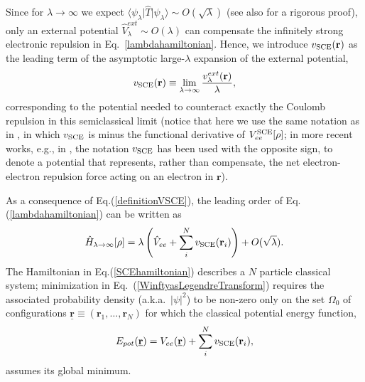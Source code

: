 \documentclass[aps,pra,twocolumn,superscriptaddress]{revtex4}
\begin{document}
Since for $\lambda\to\infty$ we expect $\langle\psi_{\lambda}\vert\hat{T}\vert\psi_{\lambda}\rangle\sim O(\sqrt{\lambda})$ \citep{Sei-PRA-99,SeiGorSav-PRA-07,GorVigSei-JCTC-09} (see also \citep{Lew-arxiv-17} for a rigorous proof),  only an external potential $\hat{V}_{\lambda}^{ext}\sim O(\lambda)$ can compensate the infinitely strong electronic repulsion in Eq.~\eqref{lambdahamiltonian}. Hence, we introduce $v_{\rm{SCE}}(\textbf{r})$ as the leading term of the asymptotic large-$\lambda$ expansion of the external potential,
 \begin{equation}\label{definitionVSCE}
v_{\rm{SCE}}(\textbf{r})\equiv \lim_{\lambda\to\infty}\frac{v^{ext}_{\lambda}(\textbf{r})}{\lambda},
\end{equation}
corresponding to the potential needed to counteract exactly the Coulomb repulsion in this semiclassical limit \citep{SeiGorSav-PRA-07} (notice that here we use the same notation as in \citep{SeiGorSav-PRA-07,GorVigSei-JCTC-09}, in which $v_{\rm SCE}$ is minus the functional derivative of $V_{ee}^{\rm SCE}[\rho]$; in more recent works, e.g., in \cite{MalGor-PRL-12,MenMalGor-PRB-14,LanDiMGerLeeGor-PCCP-16,CorKarLanLee-PRA-17}, the notation $v_{\rm SCE}$ has been used with the opposite sign, to denote a potential that represents, rather than compensate, the net electron-electron repulsion force acting on an electron in $\textbf{r}$).

As a consequence of Eq.(\ref{definitionVSCE}), the leading order of Eq.(\ref{lambdahamiltonian}) can be written as
\begin{equation}\label{SCEhamiltonian}
\hat{H}_{\lambda\rightarrow\infty}[\rho]=\lambda\left(\hat{V}_{ee}+\sum_i^Nv_{\rm{SCE}}(\textbf{r}_i)\right)+O(\sqrt{\lambda}).
\end{equation}
The Hamiltonian in Eq.(\ref{SCEhamiltonian}) describes a $N$ particle classical system; minimization in Eq.~(\ref{WinftyasLegendreTransform}) requires the associated probability density (a.k.a.~$|\psi|^2$) to be non-zero only on the set $\Omega_0$ of configurations $\underline{\textbf{r}}\equiv(\textbf{r}_1,\ldots,\textbf{r}_N)$ for which the classical potential energy function,
\begin{equation}\label{Epotdefinition}
E_{pot}(\underline{\textbf{r}})=V_{ee}(\underline{\textbf{r}})+\sum_i^Nv_{\rm{\rm{SCE}}}(\textbf{r}_i),
\end{equation}assumes its global minimum. 
\end{document}
